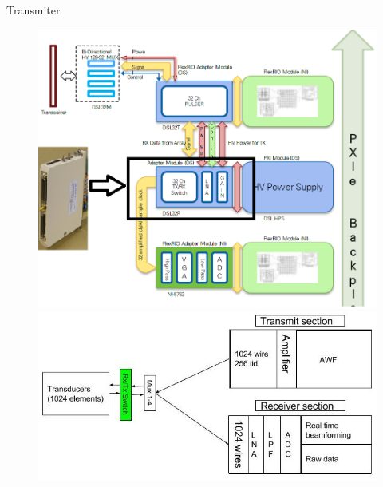 \documentclass[t,12pt,english
\ifx\beamermode\undefined\else,\beamermode\fi
]{beamer}
\begin{document}
\begin{frame}{Transmiter}

\begin{figure}[!htb]
\includegraphics[width=.95\textwidth]{2_3.png}
\endminipage
{}
\includegraphics[width=1\textwidth,left]{42.jpg}
\endminipage
\end{figure}

\end{frame}
\end{document}
